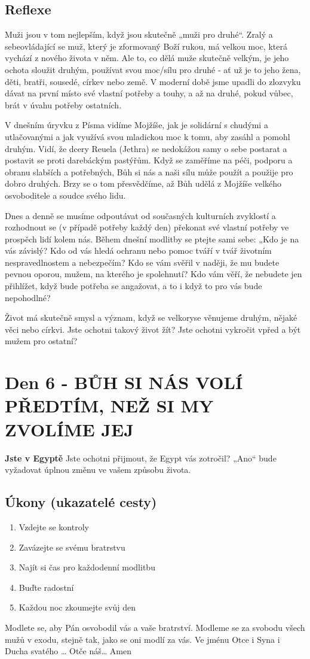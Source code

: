 \documentclass[11pt]{article}
\newcommand{\zacatekPrvniTyden}{
  \textbf{Jste v Egyptě} \newline
  Jste ochotni přijmout, že Egypt vás zotročil? „Ano“ bude vyžadovat úplnou změnu ve vašem způsobu života.

\subsection*{Úkony (ukazatelé cesty)}
\begin{enumerate}
  \item Vzdejte se kontroly
  \item Zavázejte se svému bratrstvu
  \item Najít si čas pro každodenní modlitbu
  \item Buďte radostní
  \item Každou noc zkoumejte svůj den
\end{enumerate}
Modlete se, aby Pán osvobodil vás a vaše bratrství. \newline
Modleme se za svobodu všech mužů v exodu, stejně tak, jako se oni modlí za vás.\newline
Ve jménu Otce i Syna i Ducha svatého …  Otče náš… Amen
}
\begin{document}
\subsection*{Reflexe}

Muži jsou v tom nejlepším, když jsou skutečně „muži pro druhé“. Zralý a sebeovládající se muž, který je zformovaný Boží rukou, má velkou moc, která vychází z nového života v něm.
Ale to, co dělá muže skutečně velkým, je jeho ochota sloužit druhým, používat svou moc/sílu pro druhé - ať už je to jeho žena, děti, bratři, sousedé, církev nebo země. V moderní době jsme upadli do zlozvyku dávat na první místo své vlastní potřeby a touhy, a až na druhé, pokud vůbec, brát v úvahu potřeby ostatních.

V dnešním úryvku z Písma vidíme Mojžíše, jak je solidární s chudými a utlačovanými a jak využívá svou mladickou moc k tomu, aby zasáhl a pomohl druhým. Vidí, že dcery Reuela (Jethra) se nedokážou samy o sebe postarat a postavit se proti darebáckým pastýřům.
Když se zaměříme na péči, podporu a obranu slabších a potřebných, Bůh si nás a naši sílu může použít a použije pro dobro druhých. Brzy se o tom přesvědčíme, až Bůh udělá z Mojžíše velkého osvoboditele a soudce svého lidu.

Dnes a denně se musíme odpoutávat od současných kulturních zvyklostí a rozhodnout se (v případě potřeby každý den) překonat své vlastní potřeby ve prospěch lidí kolem nás.
Během dnešní modlitby se ptejte sami sebe: „Kdo je na vás závislý? Kdo od vás hledá ochranu nebo pomoc tváří v tvář životním nespravedlnostem a nebezpečím? Kdo se vám svěřil v naději, že mu budete pevnou oporou, mužem, na kterého je spolehnutí? Kdo vám věří, že nebudete jen přihlížet, když bude potřeba se angažovat, a to i když to pro vás bude nepohodlné?

Život má skutečně smysl a význam, když se velkoryse věnujeme druhým, nějaké věci nebo církvi.
Jste ochotni takový život žít? Jste ochotni vykročit vpřed a být mužem pro ostatní?

\newpage
\section{Den 6 - BŮH SI NÁS VOLÍ PŘEDTÍM, NEŽ SI MY ZVOLÍME JEJ}
\zacatekPrvniTyden
\end{document}

